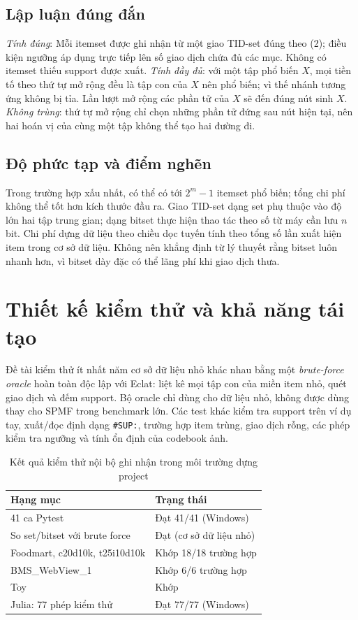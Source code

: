\documentclass[conference,10pt]{IEEEtran}
\newcommand{\myitem}[1]{\texttt{#1}}
\begin{document}
\subsection{Lập luận đúng đắn}
\textit{Tính đúng}: Mỗi itemset được ghi nhận từ một giao TID-set đúng theo (2); điều kiện ngưỡng áp dụng trực tiếp lên số giao dịch chứa đủ các mục. Không có itemset thiếu support được xuất. \textit{Tính đầy đủ}: với một tập phổ biến $X$, mọi tiền tố theo thứ tự mở rộng đều là tập con của $X$ nên phổ biến; vì thế nhánh tương ứng không bị tỉa. Lần lượt mở rộng các phần tử của $X$ sẽ đến đúng nút sinh $X$. \textit{Không trùng}: thứ tự mở rộng chỉ chọn những phần tử đứng sau nút hiện tại, nên hai hoán vị của cùng một tập không thể tạo hai đường đi.

\subsection{Độ phức tạp và điểm nghẽn}
Trong trường hợp xấu nhất, có thể có tới $2^m-1$ itemset phổ biến; tổng chi phí không thể tốt hơn kích thước đầu ra. Giao TID-set dạng set phụ thuộc vào độ lớn hai tập trung gian; dạng bitset thực hiện thao tác theo số từ máy cần lưu $n$ bit. Chi phí dựng dữ liệu theo chiều dọc tuyến tính theo tổng số lần xuất hiện item trong cơ sở dữ liệu. Không nên khẳng định từ lý thuyết rằng bitset luôn nhanh hơn, vì bitset dày đặc có thể lãng phí khi giao dịch thưa.



\section{Thiết kế kiểm thử và khả năng tái tạo}
Đề tài kiểm thử ít nhất năm cơ sở dữ liệu nhỏ khác nhau bằng một \emph{brute-force oracle} hoàn toàn độc lập với Eclat: liệt kê mọi tập con của miền item nhỏ, quét giao dịch và đếm support. Bộ oracle chỉ dùng cho dữ liệu nhỏ, không được dùng thay cho SPMF trong benchmark lớn. Các test khác kiểm tra support trên ví dụ tay, xuất/đọc định dạng \myitem{\#SUP:}, trường hợp item trùng, giao dịch rỗng, các phép kiểm tra ngưỡng và tính ổn định của codebook ảnh.

\begin{table}[t]
\centering\caption{Kết quả kiểm thử nội bộ ghi nhận trong môi trường dựng project}\label{tab:test}
\begin{tabular}{@{}p{}p{}@{}}\toprule
Hạng mục & Trạng thái\\\midrule
41 ca Pytest & Đạt 41/41 (Windows)\\
So set/bitset với brute force & Đạt (cơ sở dữ liệu nhỏ)\\
Foodmart, c20d10k, t25i10d10k & Khớp 18/18 trường hợp\\
BMS\_WebView\_1 & Khớp 6/6 trường hợp\\
Toy & Khớp\\
Julia: 77 phép kiểm thử & Đạt 77/77 (Windows)\\\bottomrule
\end{tabular}
\end{table}
\end{document}
